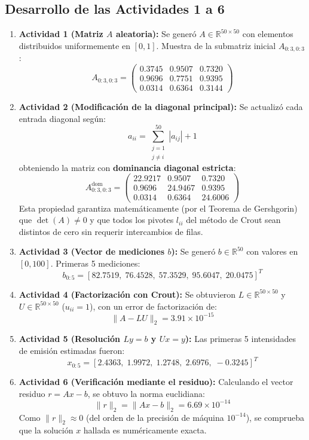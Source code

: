 \documentclass[11pt,a4paper]{article}
\begin{document}
\subsection{Desarrollo de las Actividades 1 a 6}
\begin{enumerate}[leftmargin=*]
    \item \textbf{Actividad 1 (Matriz $A$ aleatoria):} Se generó $A \in \mathbb{R}^{50 \times 50}$ con elementos distribuidos uniformemente en $[0, 1]$. Muestra de la submatriz inicial $A_{0:3, 0:3}$:
    \[
        A_{0:3, 0:3} = \begin{pmatrix}
            0.3745 & 0.9507 & 0.7320 \\
            0.9696 & 0.7751 & 0.9395 \\
            0.0314 & 0.6364 & 0.3144
        \end{pmatrix}
    \]
    \item \textbf{Actividad 2 (Modificación de la diagonal principal):} Se actualizó cada entrada diagonal según:
    \begin{equation}
        a_{ii} = \sum_{\substack{j=1 \\ j \neq i}}^{50} |a_{ij}| + 1
    \end{equation}
    obteniendo la matriz con \textbf{dominancia diagonal estricta}:
    \[
        A^{\text{dom}}_{0:3, 0:3} = \begin{pmatrix}
            22.9217 & 0.9507 & 0.7320 \\
            0.9696 & 24.9467 & 0.9395 \\
            0.0314 & 0.6364 & 24.6006
        \end{pmatrix}
    \]
    Esta propiedad garantiza matemáticamente (por el Teorema de Gershgorin) que $\det(A) \neq 0$ y que todos los pivotes $l_{ii}$ del método de Crout sean distintos de cero sin requerir intercambios de filas.
    \item \textbf{Actividad 3 (Vector de mediciones $b$):} Se generó $b \in \mathbb{R}^{50}$ con valores en $[0, 100]$. Primeras 5 mediciones:
    \[
        b_{0:5} = [82.7519, \; 76.4528, \; 57.3529, \; 95.6047, \; 20.0475]^T
    \]
    \item \textbf{Actividad 4 (Factorización con Crout):} Se obtuvieron $L \in \mathbb{R}^{50 \times 50}$ y $U \in \mathbb{R}^{50 \times 50}$ ($u_{ii} = 1$), con un error de factorización de:
    \[
        \|A - LU\|_2 = 3.91 \times 10^{-15}
    \]
    \item \textbf{Actividad 5 (Resolución $Ly = b$ y $Ux = y$):} Las primeras 5 intensidades de emisión estimadas fueron:
    \[
        x_{0:5} = [2.4363, \; 1.9972, \; 1.2748, \; 2.6976, \; -0.3245]^T
    \]
    \item \textbf{Actividad 6 (Verificación mediante el residuo):} Calculando el vector residuo $r = Ax - b$, se obtuvo la norma euclidiana:
    \begin{equation}
        \|r\|_2 = \|Ax - b\|_2 = 6.69 \times 10^{-14}
    \end{equation}
    Como $\|r\|_2 \approx 0$ (del orden de la precisión de máquina $10^{-14}$), se comprueba que la solución $x$ hallada es numéricamente exacta.
\end{enumerate}
\end{document}
